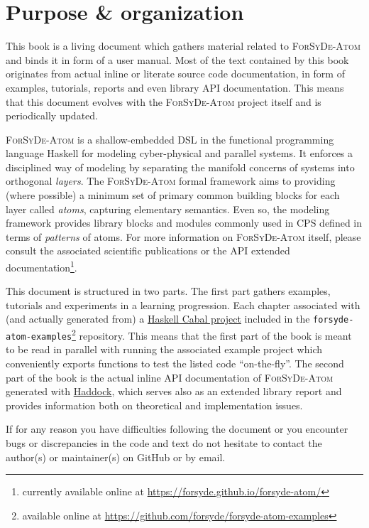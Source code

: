 \section{Purpose \& organization}
\label{sec:purp-organ}

This book is a living document which gathers material related to \textsc{ForSyDe-Atom} and binds it in form of a user manual. Most of the text contained by this book originates from actual inline or literate source code documentation, in form of examples, tutorials, reports and even library API documentation. This means that this document evolves with the \textsc{ForSyDe-Atom} project itself and is periodically updated.

\textsc{ForSyDe-Atom} is a shallow-embedded DSL in the functional programming language Haskell for modeling cyber-physical and parallel systems. It enforces a disciplined way of modeling by separating the manifold concerns of systems into orthogonal \emph{layers}. The \textsc{ForSyDe-Atom} formal framework aims to providing (where possible) a minimum set of primary common building blocks for each layer called \emph{atoms}, capturing elementary semantics. Even so, the modeling framework provides library blocks and modules commonly used in CPS defined in terms of \emph{patterns} of atoms. For more information on \textsc{ForSyDe-Atom} itself, please consult the associated scientific publications or the API extended documentation\footnote{currently available online at \url{https://forsyde.github.io/forsyde-atom/}}.

This document is structured in two parts. The first part gathers examples, tutorials and experiments in a learning progression. Each chapter associated with (and actually generated from) a \href{https://www.haskell.org/cabal/}{Haskell Cabal project} included in the \texttt{forsyde-atom-examples}\footnote{available online at \url{https://github.com/forsyde/forsyde-atom-examples}} repository. This means that the first part of the book is meant to be read in parallel with running the associated example project which conveniently exports functions to test the listed code ``on-the-fly''. The second part of the book is the actual inline API documentation of \textsc{ForSyDe-Atom} generated with \href{https://www.haskell.org/haddock/}{Haddock}, which serves also as an extended library report and provides information both on theoretical and implementation issues.

\begin{summary}
  If for any reason you have difficulties following the document or you encounter bugs or discrepancies in the code and text do not hesitate to contact the author(s) or maintainer(s) on GitHub or by email. 
\end{summary}

